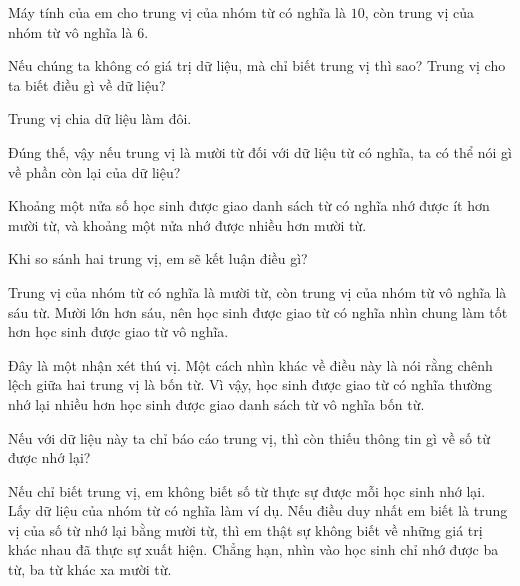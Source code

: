 {\begin{scriptlist}
      \item [Học sinh D:] Máy tính của em cho trung vị của nhóm từ có nghĩa là $10$, còn trung vị của nhóm từ vô nghĩa là $6$.

      \item [Giáo viên:] Nếu chúng ta không có giá trị dữ liệu, mà chỉ biết trung vị thì sao? Trung vị cho ta biết điều gì về dữ liệu?

      \item [Học sinh D:] Trung vị chia dữ liệu làm đôi.\vspace{\baselineskip}

      \item [Giáo viên:] Đúng thế, vậy nếu trung vị là mười từ đối với dữ liệu từ có nghĩa, ta có thể nói gì về phần còn lại của dữ liệu?

      \item [Học sinh F:] Khoảng một nửa số học sinh được giao danh sách từ có nghĩa nhớ được ít hơn mười từ, và khoảng một nửa nhớ được nhiều hơn mười từ.\vspace{\baselineskip}

      \item [Giáo viên:] Khi so sánh hai trung vị, em sẽ kết luận điều gì?

      \item [Học sinh F:] Trung vị của nhóm từ có nghĩa là mười từ, còn trung vị của nhóm từ vô nghĩa là sáu từ. Mười lớn hơn sáu, nên học sinh được giao từ có nghĩa nhìn chung làm tốt hơn học sinh được giao từ vô nghĩa.\vspace{\baselineskip}

      \item [Giáo viên:] Đây là một nhận xét thú vị. Một cách nhìn khác về điều này là nói rằng chênh lệch giữa hai trung vị là bốn từ. Vì vậy, học sinh được giao từ có nghĩa thường nhớ lại nhiều hơn học sinh được giao danh sách từ vô nghĩa bốn từ.\vspace{\baselineskip}

      \item [Giáo viên:] Nếu với dữ liệu này ta chỉ báo cáo trung vị, thì còn thiếu thông tin gì về số từ được nhớ lại?

      \item [Học sinh G:] Nếu chỉ biết trung vị, em không biết số từ thực sự được mỗi học sinh nhớ lại. Lấy dữ liệu của nhóm từ có nghĩa làm ví dụ. Nếu điều duy nhất em biết là trung vị của số từ nhớ lại bằng mười từ, thì em thật sự không biết về những giá trị khác nhau đã thực sự xuất hiện. Chẳng hạn, nhìn vào học sinh chỉ nhớ được ba từ, ba từ khác xa mười từ.\vspace{\baselineskip}


\end{scriptlist}}
